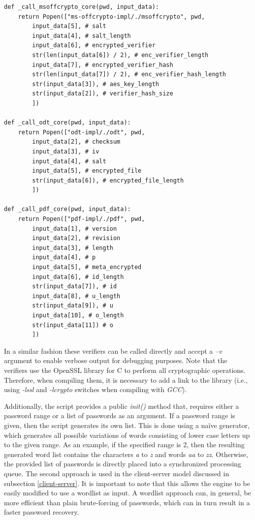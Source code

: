 \documentclass[11pt,oneside]{fithesis2}
\begin{document}
\begin{lstlisting}
def _call_msoffcrypto_core(pwd, input_data):
    return Popen(["ms-offcrypto-impl/./msoffcrypto", pwd, 
        input_data[5], # salt
        input_data[4], # salt_length
        input_data[6], # encrypted_verifier
        str(len(input_data[6]) / 2), # enc_verifier_length
        input_data[7], # encrypted_verifier_hash
        str(len(input_data[7]) / 2), # enc_verifier_hash_length
        str(input_data[3]), # aes_key_length
        str(input_data[2]), # verifier_hash_size
        ])

def _call_odt_core(pwd, input_data):
    return Popen(["odt-impl/./odt", pwd, 
        input_data[2], # checksum
        input_data[3], # iv
        input_data[4], # salt
        input_data[5], # encrypted_file
        str(input_data[6]), # encrypted_file_length
        ]) 

def _call_pdf_core(pwd, input_data):
    return Popen(["pdf-impl/./pdf", pwd, 
        input_data[1], # version
        input_data[2], # revision
        input_data[3], # length
        input_data[4], # p
        input_data[5], # meta_encrypted 
        input_data[6], # id_length 
        str(input_data[7]), # id
        input_data[8], # u_length 
        str(input_data[9]), # u 
        input_data[10], # o_length
        str(input_data[11]) # o
        ]) 
\end{lstlisting}


In a similar fashion these verifiers can be called directly and accept a \textit{–v} argument to enable verbose output for debugging purposes. Note that the verifiers use the OpenSSL library for C \cite{openssl} to perform all cryptographic operations. Therefore, when compiling them, it is necessary to add a link to the library (i.e., using \textit{-lssl} and \textit{-lcrypto} switches when compiling with \textit{GCC}).

Additionally, the script provides a public \textit{init()} method that, requires either a password range or a list of passwords as an argument. If a password range is given, then the script generates its own list. This is done using a naïve generator, which generates all possible variations of words consisting of lower case letters up to the given range. As an example, if the specified range is 2, then the resulting generated word list contains the characters \textit{a} to \textit{z} and words \textit{aa} to \textit{zz}. Otherwise, the provided list of passwords is directly placed into a synchronized processing queue. The second approach is used in the client-server model discussed in subsection \ref{client-server}. It is important to note that this allows the engine to be easily modified to use a wordlist as input. A wordlist approach can, in general, be more efficient than plain brute-forcing of passwords, which can in turn result in a faster password recovery.
\end{document}
